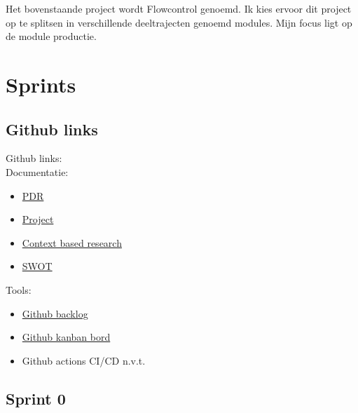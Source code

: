 \documentclass[11pt, twoside]{report}
\begin{document}
    \newline

    Het bovenstaande project wordt Flowcontrol genoemd. Ik kies ervoor dit project op te splitsen in verschillende
    deeltrajecten genoemd modules. Mijn focus ligt op de module productie.

    \newpage

    \chapter{Sprints}
    \label{ch:sprints}

    \section{Github links}\label{sec:github-links}
    Github links: \\
    \newline
    Documentatie:
    \begin{itemize}
        \item \href{https://github.com/rikp777/RP-Flowcontrol/blob/master/documentation/PDR/out/PDR_Rik_Peeters.pdf}{PDR}
        \item \href{https://github.com/rikp777/RP-Flowcontrol/blob/master/documentation/project/out/Project_Rik_Peeters.pdf}{Project}
        \item \href{https://github.com/rikp777/RP-Flowcontrol/blob/master/documentation/context_based_research/out/context_based_research_Rik_Peeters.pdf}{Context based research}
        \item \href{https://github.com/rikp777/RP-Flowcontrol/blob/master/documentation/SWOT/out/SWOT_Rik_Peeters.pdf}{SWOT}
    \end{itemize}
    \newline
    Tools:
    \begin{itemize}
        \item \href{https://github.com/rikp777/RP-Flowcontrol/issues}{Github backlog}
        \item \href{https://github.com/rikp777/RP-Flowcontrol/projects/1}{Github kanban bord}
        \item Github actions CI/CD n.v.t.
    \end{itemize}

    \newpage
    \section{Sprint 0}
    \label{sec:sprint-0}
\end{document}

